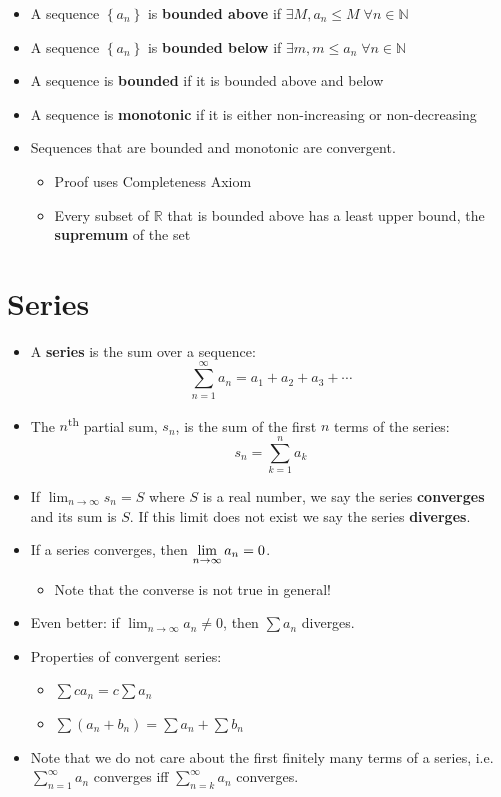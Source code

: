 \documentclass[letterpaper, 11pt, openany]{book}
\theoremstyle{mytheoremstyle}
\theoremstyle{myexamplestyle}
\begin{document}
\begin{itemize}
    \item A sequence $\left\{a_{n}\right\}$ is \textbf{bounded above} if $\exists M, a_{n} \leq M\; \forall n\in \mathbb{N}$
    \item A sequence $\left\{a_{n}\right\}$ is \textbf{bounded below} if $\exists m, m \leq a_{n}\; \forall n\in \mathbb{N}$
    \item A sequence is \textbf{bounded} if it is bounded above and below
    \item A sequence is \textbf{monotonic} if it is either non-increasing or non-decreasing
    \item Sequences that are bounded and monotonic are convergent.
    \begin{itemize}
        \item Proof uses Completeness Axiom
        \item Every subset of $\mathbb{R}$ that is bounded above has a least upper bound, the \textbf{supremum} of the set
    \end{itemize}
\end{itemize}

\section{Series}
\setcounter{figure}{0}
\begin{itemize}
    \item A \textbf{series} is the sum over a sequence:
    \[\sum_{n=1}^{\infty} a_{n} = a_{1} + a_{2} + a_{3} + \cdots\]
    \item The $n$\textsuperscript{th} partial sum, $s_{n}$, is the sum of the first $n$ terms of the series:
    \[s_{n} = \sum_{k=1}^{n} a_{k}\]
    \item If $\displaystyle \lim_{n \to \infty} s_{n} = S$ where $S$ is a real number, we say the series \textbf{converges} and its sum is $S$. If this limit does not exist we say the series \textbf{diverges}.
    \item If a series converges, then $\displaystyle \displaystyle \lim_{n \to \infty} a_{n} = 0$.
    \begin{itemize}
        \item[{\faExclamationTriangle[solid]}] Note that the converse is not true in general!
    \end{itemize}
    \item Even better: if $\displaystyle \lim_{n \to \infty} a_{n} \neq 0$, then $\sum a_{n}$ diverges.
    \item Properties of convergent series:
    \begin{itemize}
        \item $\displaystyle \sum c a_{n} = c \sum a_{n}$
        \item $\displaystyle \sum (a_{n} + b_{n}) = \sum a_{n} + \sum b_{n}$
    \end{itemize}
    \item[{\faExclamationCircle[solid]}] Note that we do not care about the first finitely many terms of a series, i.e. $\displaystyle \sum_{n = 1}^{\infty} a_{n}$ converges iff $\displaystyle \sum_{n = k}^{\infty} a_{n}$ converges.
\end{itemize}
\end{document}
